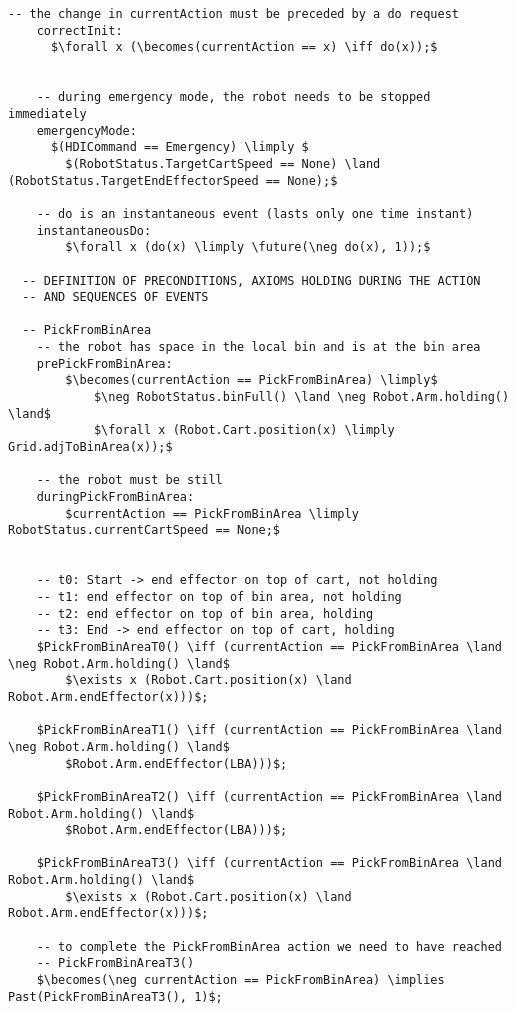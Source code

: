\begin{lstlisting}[fontadjust, mathescape, frame=single]
    -- the change in currentAction must be preceded by a do request
    correctInit:
      $\forall x (\becomes(currentAction == x) \iff do(x));$

    
    -- during emergency mode, the robot needs to be stopped immediately
    emergencyMode:
      $(HDICommand == Emergency) \limply $
        $(RobotStatus.TargetCartSpeed == None) \land (RobotStatus.TargetEndEffectorSpeed == None);$

    -- do is an instantaneous event (lasts only one time instant)
    instantaneousDo:
        $\forall x (do(x) \limply \future(\neg do(x), 1));$

  -- DEFINITION OF PRECONDITIONS, AXIOMS HOLDING DURING THE ACTION 
  -- AND SEQUENCES OF EVENTS

  -- PickFromBinArea
    -- the robot has space in the local bin and is at the bin area
    prePickFromBinArea:
        $\becomes(currentAction == PickFromBinArea) \limply$
            $\neg RobotStatus.binFull() \land \neg Robot.Arm.holding() \land$
            $\forall x (Robot.Cart.position(x) \limply Grid.adjToBinArea(x));$

    -- the robot must be still
    duringPickFromBinArea:
        $currentAction == PickFromBinArea \limply RobotStatus.currentCartSpeed == None;$

    
    -- t0: Start -> end effector on top of cart, not holding
    -- t1: end effector on top of bin area, not holding
    -- t2: end effector on top of bin area, holding
    -- t3: End -> end effector on top of cart, holding
    $PickFromBinAreaT0() \iff (currentAction == PickFromBinArea \land \neg Robot.Arm.holding() \land$
        $\exists x (Robot.Cart.position(x) \land Robot.Arm.endEffector(x)))$;
    
    $PickFromBinAreaT1() \iff (currentAction == PickFromBinArea \land \neg Robot.Arm.holding() \land$
        $Robot.Arm.endEffector(LBA)))$;
    
    $PickFromBinAreaT2() \iff (currentAction == PickFromBinArea \land Robot.Arm.holding() \land$
        $Robot.Arm.endEffector(LBA)))$;
    
    $PickFromBinAreaT3() \iff (currentAction == PickFromBinArea \land Robot.Arm.holding() \land$
        $\exists x (Robot.Cart.position(x) \land Robot.Arm.endEffector(x)))$;
    
    -- to complete the PickFromBinArea action we need to have reached
    -- PickFromBinAreaT3()
    $\becomes(\neg currentAction == PickFromBinArea) \implies Past(PickFromBinAreaT3(), 1)$;
    

\end{lstlisting}
